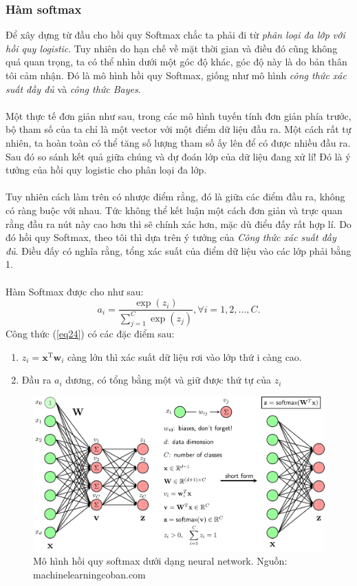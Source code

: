 \documentclass{article}
\begin{document}
\subsubsection*{Hàm softmax}
Để xây dựng từ đầu cho hồi quy Softmax chắc ta phải đi từ \textit{phân loại đa lớp với hồi quy logistic}. Tuy nhiên do hạn chế về mặt thời gian và điều đó cũng không quá quan trọng, ta có thể nhìn dưới một góc độ khác, góc độ này là do bản thân tôi cảm nhận. Đó là mô hình hồi quy Softmax, giống như mô hình \textit{công thức xác suất đầy đủ} và \textit{công thức Bayes}.\\\\
Một thực tế đơn giản như sau, trong các mô hình tuyến tính đơn giản phía trước, bộ tham số của ta chỉ là một vector với một điểm dữ liệu đầu ra. Một cách rất tự nhiên, ta hoàn toàn có thể tăng số lượng tham số ấy lên để có được nhiều đầu ra. Sau đó so sánh kết quả giữa chúng và dự đoán lớp của dữ liệu đang xử lí! Đó là ý tưởng của hồi quy logistic cho phân loại đa lớp.\\\\
Tuy nhiên cách làm trên có nhược điểm rằng, đó là giữa các điểm đầu ra, không có ràng buộc với nhau. Tức không thể kết luận một cách đơn giản và trực quan rằng đầu ra nút này cao hơn thì sẽ chính xác hơn, mặc dù điểu đấy rất hợp lí. Do đó hồi quy Softmax, theo tôi thì dựa trên ý tưởng của \textit{Công thức xác suất đầy đủ}. Điều đấy có nghĩa rằng, tổng xác suất của điểm dữ liệu vào các lớp phải bằng 1.\\\\
Hàm Softmax được cho như sau:
\begin{equation}
    a_i = \frac{\exp(z_i)}{\sum_{j=1}^{C}\exp(z_j)}, \forall i = 1,2,\ldots,C.
    \label{eq24}
\end{equation}
Công thức (\ref{eq24}) có các đặc điểm sau:
\begin{enumerate}
    \item $z_i = \textbf{x}^{\text{T}}\textbf{w}_i$ càng lớn thì xác suất dữ liệu rơi vào lớp thứ i càng cao.
    \item Đầu ra $a_i$ dương, có tổng bằng một và giữ được thứ tự của $z_i$
\end{enumerate}
\begin{figure}[ht!]
    \centering
    \includegraphics[width = \linewidth]{softmax.png}
    \caption{Mô hình hồi quy softmax dưới dạng neural network. Nguồn: machinelearningcoban.com}
    \label{fig17}
\end{figure}
\end{document}

